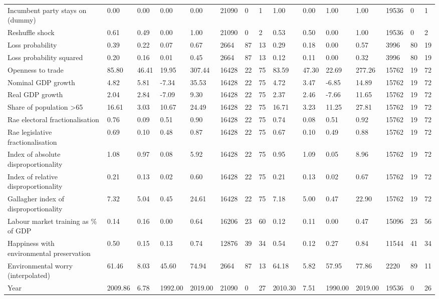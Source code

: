 \begin{longtable}{lllllllllllllll}
Incumbent party stays on (dummy) & 0.00 & 0.00 & 0.00 & 0.00 & 21090 & 0 & 1 & 1.00 & 0.00 & 1.00 & 1.00 & 19536 & 0 & 1\\
Reshuffle shock & 0.61 & 0.49 & 0.00 & 1.00 & 21090 & 0 & 2 & 0.53 & 0.50 & 0.00 & 1.00 & 19536 & 0 & 2\\
\addlinespace
Loss probability & 0.39 & 0.22 & 0.07 & 0.67 & 2664 & 87 & 13 & 0.29 & 0.18 & 0.00 & 0.57 & 3996 & 80 & 19\\
Loss probability squared & 0.20 & 0.16 & 0.01 & 0.45 & 2664 & 87 & 13 & 0.12 & 0.11 & 0.00 & 0.32 & 3996 & 80 & 19\\
Openness to trade & 85.80 & 46.41 & 19.95 & 307.44 & 16428 & 22 & 75 & 83.59 & 47.30 & 22.69 & 277.26 & 15762 & 19 & 72\\
Nominal GDP growth & 4.82 & 5.81 & -7.34 & 35.53 & 16428 & 22 & 75 & 4.72 & 3.47 & -6.85 & 14.89 & 15762 & 19 & 72\\
Real GDP growth & 2.04 & 2.84 & -7.09 & 9.30 & 16428 & 22 & 75 & 2.37 & 2.46 & -7.66 & 11.65 & 15762 & 19 & 72\\
\addlinespace
Share of population >65 & 16.61 & 3.03 & 10.67 & 24.49 & 16428 & 22 & 75 & 16.71 & 3.23 & 11.25 & 27.81 & 15762 & 19 & 72\\
Rae electoral fractionalisation & 0.76 & 0.09 & 0.51 & 0.90 & 16428 & 22 & 75 & 0.74 & 0.08 & 0.51 & 0.92 & 15762 & 19 & 72\\
Rae legislative fractionalisation & 0.69 & 0.10 & 0.48 & 0.87 & 16428 & 22 & 75 & 0.67 & 0.10 & 0.49 & 0.88 & 15762 & 19 & 72\\
Index of absolute disproportionality & 1.08 & 0.97 & 0.08 & 5.92 & 16428 & 22 & 75 & 0.95 & 1.09 & 0.05 & 8.96 & 15762 & 19 & 72\\
Index of relative disproportionality & 0.21 & 0.13 & 0.02 & 0.60 & 16428 & 22 & 75 & 0.21 & 0.13 & 0.02 & 0.67 & 15762 & 19 & 72\\
\addlinespace
Gallagher index of disproportionality & 7.32 & 5.04 & 0.45 & 24.61 & 16428 & 22 & 75 & 7.18 & 5.00 & 0.47 & 22.90 & 15762 & 19 & 72\\
Labour market training as \% of GDP & 0.14 & 0.16 & 0.00 & 0.64 & 16206 & 23 & 60 & 0.12 & 0.11 & 0.00 & 0.47 & 15096 & 23 & 56\\
Happiness with environmental preservation & 0.50 & 0.15 & 0.13 & 0.74 & 12876 & 39 & 34 & 0.54 & 0.12 & 0.27 & 0.84 & 11544 & 41 & 34\\
Environmental worry (interpolated) & 61.46 & 8.03 & 45.60 & 74.94 & 2664 & 87 & 13 & 64.18 & 5.82 & 57.95 & 77.86 & 2220 & 89 & 11\\
Year & 2009.86 & 6.78 & 1992.00 & 2019.00 & 21090 & 0 & 27 & 2010.30 & 7.51 & 1990.00 & 2019.00 & 19536 & 0 & 26\\
\bottomrule
\end{longtable}
